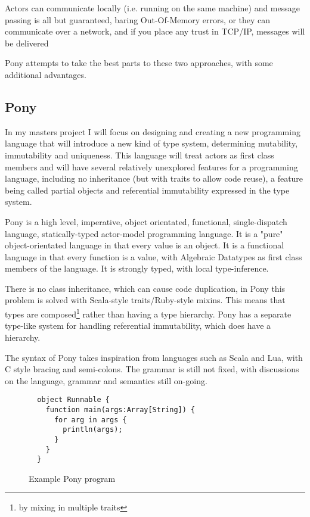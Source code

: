 \documentclass{article}
\begin{document}
Actors can communicate locally (i.e. running on the same machine) and message
passing is all but guaranteed, baring Out-Of-Memory errors, or they can communicate
over a network, and if you place any trust in TCP/IP, messages will be delivered

Pony attempts to take the best parts to these two approaches, with some
additional advantages.

\subsection{Pony}

In my masters project I will focus on designing and creating a new programming
language that will introduce a new kind of type system, determining mutability,
immutability and uniqueness. This language will treat actors as first class
members and will have several relatively unexplored features for a programming
language, including no inheritance (but with traits to allow code reuse), a
feature being called partial objects and referential immutability expressed in
the type system.

Pony is a high level, imperative, object orientated, functional, single-dispatch
language, statically-typed actor-model programming language. It is a "pure"
object-orientated language in that every value is an object. It is a functional
language in that every function is a value, with Algebraic Datatypes as first
class members of the language. It is strongly typed, with local type-inference.

There is no class inheritance, which can cause code duplication, in Pony this
problem is solved with Scala-style traits/Ruby-style mixins. This means that
types are composed\footnote{by mixing in multiple traits} rather than having a
type hierarchy. Pony has a separate type-like system for handling referential
immutability, which does have a hierarchy.

The syntax of Pony takes inspiration from languages such as Scala and Lua, with
C style bracing and semi-colons. The grammar is still not fixed, with
discussions on the language, grammar and semantics still on-going.

\begin{figure}[H]
\begin{verbatim}
  object Runnable {
    function main(args:Array[String]) {
      for arg in args {
      	println(args);
      }
    }
  }
\end{verbatim}
\caption{Example Pony program}
\label{fig:simple}
\end{figure}
\end{document}
